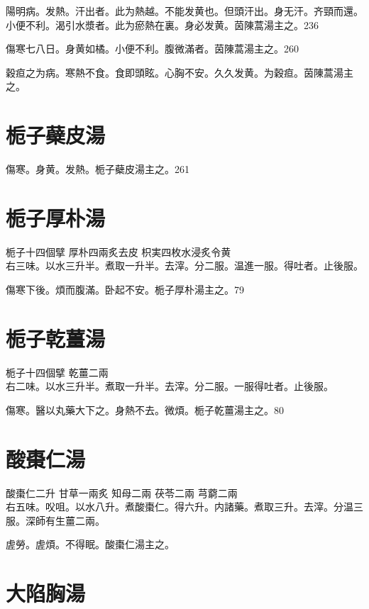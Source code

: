 陽明病。发熱。汗出者。此为熱越。不能发黄也。但頭汗出。身无汗。齐頸而還。小便不利。渴引水漿者。此为瘀熱在裏。身必发黄。茵陳{\khaaitp 蒿}湯主之。236

傷寒七八日。身黄如橘。小便不利。腹微滿者。茵陳{\khaaitp 蒿}湯主之。260

穀疸之为病。寒熱不食。食即頭眩。心胸不安。久久发黄。为穀疸。茵陳蒿湯主之。

\section{栀子蘗皮湯}

傷寒。身黄。发熱。栀子蘗皮湯主之。261

\section{栀子厚朴湯}

栀子{\scriptsize 十四個擘} 厚朴{\scriptsize 四兩炙去皮} 枳実{\scriptsize 四枚水浸炙令黄}\\
右三味。以水三升半。煮取一升半。去滓。分二服。温進一服。得吐者。止後服。

傷寒下後。煩而腹滿。卧起不安。栀子厚朴湯主之。79

\section{栀子乾薑湯}

栀子{\scriptsize 十四個擘} 乾薑{\scriptsize 二兩}\\
右二味。以水三升半。煮取一升半。去滓。分二服。一服得吐者。止後服。

傷寒。醫以丸藥大下之。身熱不去。微煩。栀子乾薑湯主之。80

\section{酸棗{\khaaitp 仁}湯}

酸棗仁{\scriptsize 二升} 甘草{\scriptsize 一兩炙} 知母{\scriptsize 二兩} 茯苓{\scriptsize 二兩} 芎藭{\scriptsize 二兩}\\
右五味。㕮咀。以水八升。煮酸棗仁。得六升。内諸藥。煮取三升。去滓。分温三服。{\scriptsize 深師有生薑二兩。}

虗勞。虗煩。不得眠。酸棗{\khaaitp 仁}湯主之。

\section{大陷胸湯}

